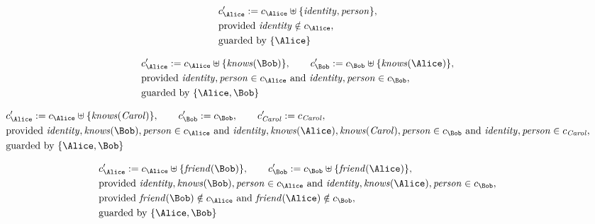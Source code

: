 \begin{align*}
&
c'_
{
\Alice
}
 := 
c_
{
\Alice
}
 \uplus 
\{
\mathit{\detokenize{
identity
}}
,
\mathit{\detokenize{
person
}}
\}
,\\
&
\text{provided } 
\mathit{\detokenize{
identity
}}
 \notin c_
{
\Alice
}
,\\
&
\text{guarded by } \{
\Alice
\}
\end{align*}

\begin{align*}
&
c'_
{
\Alice
}
 := 
c_
{
\Alice
}
 \uplus 
\{
\mathit{\detokenize{
knows
}}
(
\Bob
)
\}
, \qquad 
c'_
{
\Bob
}
 := 
c_
{
\Bob
}
 \uplus 
\{
\mathit{\detokenize{
knows
}}
(
\Alice
)
\}
,\\
&
\text{provided } 
\mathit{\detokenize{
identity
}}
,
\mathit{\detokenize{
person
}}
 \in c_
{
\Alice
}
 \text{ and } 
\mathit{\detokenize{
identity
}}
,
\mathit{\detokenize{
person
}}
 \in c_
{
\Bob
}
,\\
&
\text{guarded by } \{
\Alice
,
\Bob
\}
\end{align*}

\begin{align*}
&
c'_
{
\Alice
}
 := 
c_
{
\Alice
}
 \uplus 
\{
\mathit{\detokenize{
knows
}}
(
\mathit{Carol}
)
\}
, \qquad 
c'_
{
\Bob
}
 := 
c_
{
\Bob
}
, \qquad 
c'_
{
\mathit{Carol}
}
 := 
c_
{
\mathit{Carol}
}
,\\
&
\text{provided } 
\mathit{\detokenize{
identity
}}
,
\mathit{\detokenize{
knows
}}
(
\Bob
)
,
\mathit{\detokenize{
person
}}
 \in c_
{
\Alice
}
 \text{ and } 
\mathit{\detokenize{
identity
}}
,
\mathit{\detokenize{
knows
}}
(
\Alice
)
,
\mathit{\detokenize{
knows
}}
(
\mathit{Carol}
)
,
\mathit{\detokenize{
person
}}
 \in c_
{
\Bob
}
 \text{ and } 
\mathit{\detokenize{
identity
}}
,
\mathit{\detokenize{
person
}}
 \in c_
{
\mathit{Carol}
}
,\\
&
\text{guarded by } \{
\Alice
,
\Bob
\}
\end{align*}

\begin{align*}
&
c'_
{
\Alice
}
 := 
c_
{
\Alice
}
 \uplus 
\{
\mathit{\detokenize{
friend
}}
(
\Bob
)
\}
, \qquad 
c'_
{
\Bob
}
 := 
c_
{
\Bob
}
 \uplus 
\{
\mathit{\detokenize{
friend
}}
(
\Alice
)
\}
,\\
&
\text{provided } 
\mathit{\detokenize{
identity
}}
,
\mathit{\detokenize{
knows
}}
(
\Bob
)
,
\mathit{\detokenize{
person
}}
 \in c_
{
\Alice
}
 \text{ and } 
\mathit{\detokenize{
identity
}}
,
\mathit{\detokenize{
knows
}}
(
\Alice
)
,
\mathit{\detokenize{
person
}}
 \in c_
{
\Bob
}
,\\
&
\text{provided } 
\mathit{\detokenize{
friend
}}
(
\Bob
)
 \notin c_
{
\Alice
}
 \text{ and } 
\mathit{\detokenize{
friend
}}
(
\Alice
)
 \notin c_
{
\Bob
}
,\\
&
\text{guarded by } \{
\Alice
,
\Bob
\}
\end{align*}
